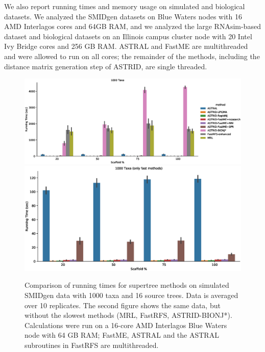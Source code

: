 We also report running times and memory usage on simulated and biological datasets. We analyzed the SMIDgen datasets on Blue Waters nodes with 16 AMD Interlagos cores and 64GB RAM, and we analyzed the large RNAsim-based dataset and biological datasets on an Illinois campus cluster node with 20 Intel Ivy Bridge cores and 256 GB RAM. ASTRAL and FastME are multithreaded and were allowed to run on all cores; the remainder of the methods, including the distance matrix generation step of ASTRID, are single threaded.


\begin{figure}[htb!]
    \centering
    \includegraphics[width=\textwidth]{astrid-missing-figs/running-times-all.eps}
    \includegraphics[width=\textwidth]{astrid-missing-figs/running-times-fast.eps}
    \caption[Running times for supertree methods on simulated SMIDgen data]{Comparison of running times for supertree methods on simulated SMIDgen data with 1000 taxa and 16 source trees. Data is averaged over 10 replicates. The second figure shows the same data, but without the slowest methods (MRL, FastRFS, ASTRID-BIONJ*). Calculations were run on a 16-core AMD Interlagos Blue Waters node with 64 GB RAM; FastME, ASTRAL and the ASTRAL subroutines in FastRFS are multithreaded.}
    \label{astrid-missing::fig:running-times}
\end{figure}


